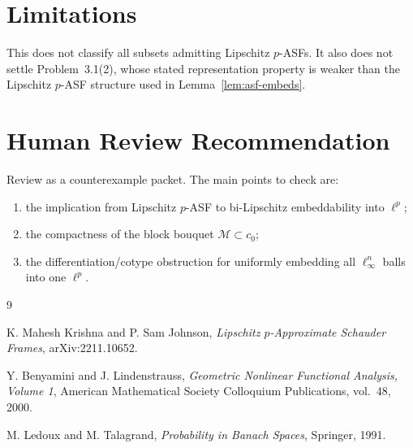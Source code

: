 \documentclass[11pt]{article}
\newcommand{\M}{\mathcal M}
\begin{document}
\section*{Limitations}

This does not classify all subsets admitting Lipschitz \(p\)-ASFs. It also
does not settle Problem~3.1(2), whose stated representation property is weaker
than the Lipschitz \(p\)-ASF structure used in Lemma~\ref{lem:asf-embeds}.

\section*{Human Review Recommendation}

Review as a counterexample packet. The main points to check are:
\begin{enumerate}
\item the implication from Lipschitz \(p\)-ASF to bi-Lipschitz embeddability
into \(\ell^p\);
\item the compactness of the block bouquet \(\M\subset c_0\);
\item the differentiation/cotype obstruction for uniformly embedding all
\(\ell_\infty^n\) balls into one \(\ell^p\).
\end{enumerate}

\begin{thebibliography}{9}

K. Mahesh Krishna and P. Sam Johnson,
\emph{Lipschitz \(p\)-Approximate Schauder Frames},
arXiv:2211.10652.

Y. Benyamini and J. Lindenstrauss,
\emph{Geometric Nonlinear Functional Analysis, Volume 1},
American Mathematical Society Colloquium Publications, vol.~48, 2000.

M. Ledoux and M. Talagrand,
\emph{Probability in Banach Spaces},
Springer, 1991.

\end{thebibliography}
\end{document}
